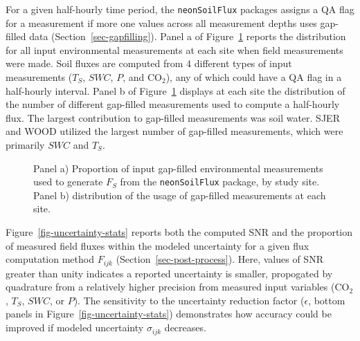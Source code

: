 \documentclass[
  letterpaper,
  DIV=11,
  numbers=noendperiod]{scrartcl}
\begin{document}
For a given half-hourly time period, the \texttt{neonSoilFlux} packages
assigns a QA flag for a measurement if more one values across all
measurement depths uses gap-filled data (Section~\ref{sec-gapfilling}).
Panel a of Figure~\ref{fig-gap-filled-stats} reports the distribution
for all input environmental measurements at each site when field
measurements were made. Soil fluxes are computed from 4 different types
of input measurements (\(T_{S}\), \(SWC\), \(P\), and CO\(_{2}\)), any
of which could have a QA flag in a half-hourly interval. Panel b of
Figure~\ref{fig-gap-filled-stats} displays at each site the distribution
of the number of different gap-filled measurements used to compute a
half-hourly flux. The largest contribution to gap-filled measurements
was soil water. SJER and WOOD utilized the largest number of gap-filled
measurements, which were primarily \(SWC\) and \(T_{S}\).

\begin{figure}


\caption{\label{fig-gap-filled-stats}Panel a) Proportion of input
gap-filled environmental measurements used to generate \(F_{S}\) from
the \texttt{neonSoilFlux} package, by study site. Panel b) distribution
of the usage of gap-filled measurements at each site.}

\end{figure}%

Figure~\ref{fig-uncertainty-stats} reports both the computed SNR and the
proportion of measured field fluxes within the modeled uncertainty for a
given flux computation method \(F_{ijk}\)
(Section~\ref{sec-post-process}). Here, values of SNR greater than unity
indicates a reported uncertainty is smaller, propogated by quadrature
from a relatively higher precision from measured input variables
(CO\(_{2}\), \(T_{S}\), \(SWC\), or \(P\)). The sensitivity to the
uncertainty reduction factor (\(\epsilon\), bottom panels in
Figure~\ref{fig-uncertainty-stats}) demonstrates how accuracy could be
improved if modeled uncertainty \(\sigma_{ijk}\) decreases.
\end{document}
